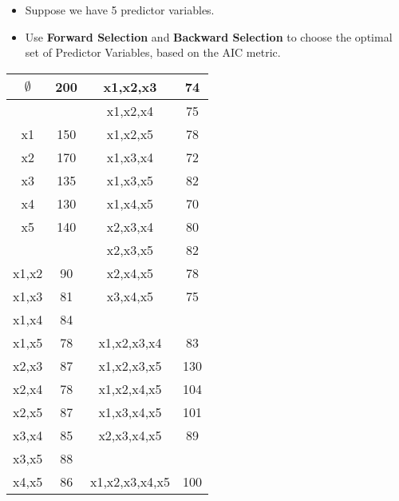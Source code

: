 \documentclass[]{report}
\begin{document}
\begin{enumerate}
\begin{itemize}
\item Suppose we have 5 predictor variables.
\item Use \textbf{Forward Selection} and \textbf{Backward Selection} to choose the optimal set of Predictor Variables, based on the AIC metric.
\end{itemize}
{
	\large
	\begin{center}
\begin{tabular}{|c|c|c|c|}
	\hline
$\emptyset$	&	200	&	x1,x2,x3	&	74	\\ \hline
\phantom{makespace}
 &	\phantom{makespace}
 	&	x1,x2,x4	&	75	\\ \hline
x1	&	150	&	x1,x2,x5	&	78	\\ \hline
x2	&	170	&	x1,x3,x4	&	72	\\ \hline
x3	&	135	&	x1,x3,x5	&	82	\\ \hline
x4	&	130	&	x1,x4,x5	&	70	\\ \hline
x5	&	140	&	x2,x3,x4	&	80	\\ \hline
&		&	x2,x3,x5	&	82	\\ \hline
x1,x2	&	90	&	x2,x4,x5	&	78	\\ \hline
x1,x3	&	81	&	x3,x4,x5	&	75	\\ \hline
x1,x4	&	84	&	\phantom{makespace}
	&	\phantom{makespace}
		\\ \hline
x1,x5	&	78	&	x1,x2,x3,x4	&	83	\\ \hline
x2,x3	&	87	&	x1,x2,x3,x5	&	130	\\ \hline
x2,x4	&	78	&	x1,x2,x4,x5	&	104	\\ \hline
x2,x5	&	87	&	x1,x3,x4,x5	&	101	\\ \hline
x3,x4	&	85	&	x2,x3,x4,x5	&	89	\\ \hline
x3,x5	&	88	&		&		\\ \hline
x4,x5	&	86	&	x1,x2,x3,x4,x5	&	100	\\ \hline
		\end{tabular} 
	\end{center}
}
\end{enumerate}
\end{document}
